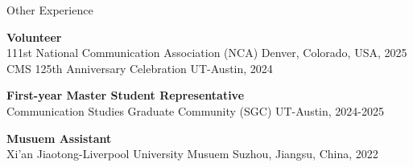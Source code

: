 \documentclass[
	11pt, %
]{resume} %
\begin{document}
\begin{rSection}{Other Experience}
	
    \textbf{Volunteer}\\ 
\textbullet\enspace 111st National Communication Association (NCA)  \hfill Denver, Colorado, USA, 2025 \\
\textbullet\enspace CMS 125th Anniversary Celebration   \hfill UT-Austin, 2024

    \textbf{First-year Master Student Representative} \\
\textbullet\enspace Communication Studies Graduate Community (SGC)  \hfill UT-Austin, 2024-2025

    \textbf{Musuem Assistant} \\
\textbullet\enspace Xi'an Jiaotong-Liverpool University Musuem  \hfill Suzhou, Jiangsu, China, 2022\\




    
\end{rSection}
\end{document}
